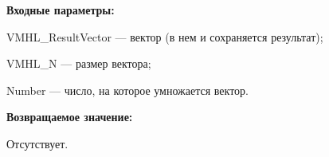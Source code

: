 \textbf{Входные параметры:}

 VMHL\_ResultVector --- вектор (в нем и сохраняется результат);
 
 VMHL\_N --- размер вектора;
 
 Number --- число, на которое умножается вектор.

\textbf{Возвращаемое значение:}

Отсутствует.